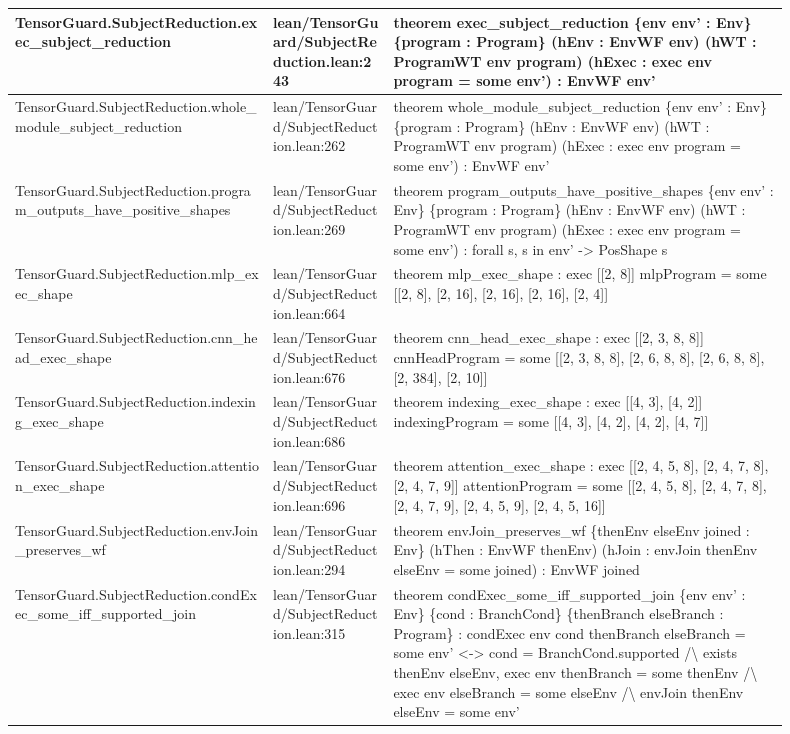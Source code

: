 \documentclass[10pt]{article}
\begin{document}
\begin{longtable}{|p{0.30\linewidth}|p{0.14\linewidth}|p{0.46\linewidth}|}
\hline
TensorGuard.SubjectReduction.exec\_subject\_reduction & lean/TensorGuard/SubjectReduction.lean:243 & theorem exec\_subject\_reduction \{env env' : Env\} \{program : Program\} (hEnv : EnvWF env) (hWT : ProgramWT env program) (hExec : exec env program = some env') : EnvWF env' \\
\hline
TensorGuard.SubjectReduction.whole\_module\_subject\_reduction & lean/TensorGuard/SubjectReduction.lean:262 & theorem whole\_module\_subject\_reduction \{env env' : Env\} \{program : Program\} (hEnv : EnvWF env) (hWT : ProgramWT env program) (hExec : exec env program = some env') : EnvWF env' \\
\hline
TensorGuard.SubjectReduction.program\_outputs\_have\_positive\_shapes & lean/TensorGuard/SubjectReduction.lean:269 & theorem program\_outputs\_have\_positive\_shapes \{env env' : Env\} \{program : Program\} (hEnv : EnvWF env) (hWT : ProgramWT env program) (hExec : exec env program = some env') : forall s, s in env' -> PosShape s \\
\hline
TensorGuard.SubjectReduction.mlp\_exec\_shape & lean/TensorGuard/SubjectReduction.lean:664 & theorem mlp\_exec\_shape : exec [[2, 8]] mlpProgram = some [[2, 8], [2, 16], [2, 16], [2, 16], [2, 4]] \\
\hline
TensorGuard.SubjectReduction.cnn\_head\_exec\_shape & lean/TensorGuard/SubjectReduction.lean:676 & theorem cnn\_head\_exec\_shape : exec [[2, 3, 8, 8]] cnnHeadProgram = some [[2, 3, 8, 8], [2, 6, 8, 8], [2, 6, 8, 8], [2, 384], [2, 10]] \\
\hline
TensorGuard.SubjectReduction.indexing\_exec\_shape & lean/TensorGuard/SubjectReduction.lean:686 & theorem indexing\_exec\_shape : exec [[4, 3], [4, 2]] indexingProgram = some [[4, 3], [4, 2], [4, 2], [4, 7]] \\
\hline
TensorGuard.SubjectReduction.attention\_exec\_shape & lean/TensorGuard/SubjectReduction.lean:696 & theorem attention\_exec\_shape : exec [[2, 4, 5, 8], [2, 4, 7, 8], [2, 4, 7, 9]] attentionProgram = some [[2, 4, 5, 8], [2, 4, 7, 8], [2, 4, 7, 9], [2, 4, 5, 9], [2, 4, 5, 16]] \\
\hline
TensorGuard.SubjectReduction.envJoin\_preserves\_wf & lean/TensorGuard/SubjectReduction.lean:294 & theorem envJoin\_preserves\_wf \{thenEnv elseEnv joined : Env\} (hThen : EnvWF thenEnv) (hJoin : envJoin thenEnv elseEnv = some joined) : EnvWF joined \\
\hline
TensorGuard.SubjectReduction.condExec\_some\_iff\_supported\_join & lean/TensorGuard/SubjectReduction.lean:315 & theorem condExec\_some\_iff\_supported\_join \{env env' : Env\} \{cond : BranchCond\} \{thenBranch elseBranch : Program\} : condExec env cond thenBranch elseBranch = some env' <-> cond = BranchCond.supported /\textbackslash{} exists thenEnv elseEnv, exec env thenBranch = some thenEnv /\textbackslash{} exec env elseBranch = some elseEnv /\textbackslash{} envJoin thenEnv elseEnv = some env' \\

\end{longtable}
\end{document}
